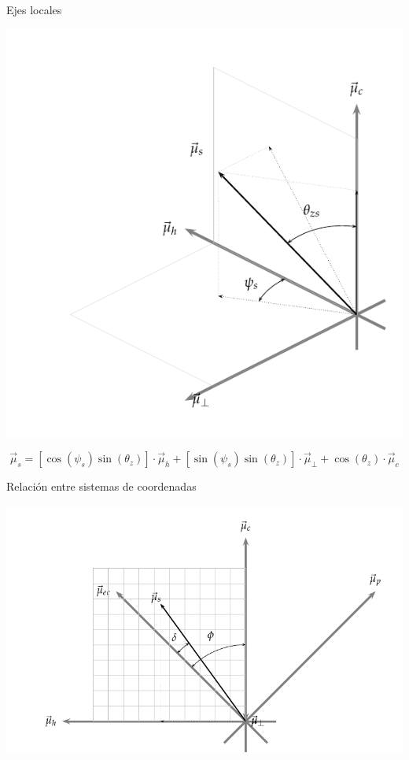 \documentclass[xcolor={usenames,svgnames,dvipsnames}]{beamer}
\begin{document}
\begin{frame}[label={sec:org1a71f62}]{Ejes locales}
\begin{center}
\includegraphics[width=.9\linewidth]{../figs/SistemaCoordenadasLocal.pdf}
\end{center}

\[\vec{\mu}_{s}=\left[\cos\left(\psi_{s}\right)\sin\left(\theta_{z}\right)\right]\cdot\vec{\mu}_{h}+\left[\sin\left(\psi_{s}\right)\sin\left(\theta_{z}\right)\right]\cdot\vec{\mu}_{\bot}+\cos\left(\theta_{z}\right)\cdot\vec{\mu}_{c}\]
\end{frame}

\begin{frame}[label={sec:org0b23c0a}]{Relación entre sistemas de coordenadas}
\begin{center}
\includegraphics[width=.9\linewidth]{../figs/RelacionSistemasCoordenadas.pdf}
\end{center}
\end{frame}
\end{document}
